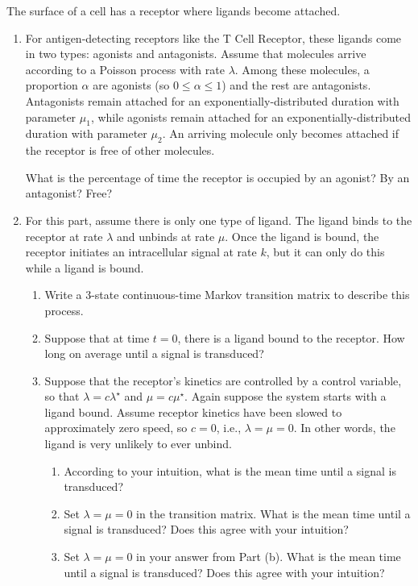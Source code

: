 \documentclass[12pt,letterpaper]{article}
\begin{document}
The surface of a cell has a receptor where ligands become attached. 

\begin{enumerate}






\item For antigen-detecting receptors like the T Cell Receptor, these ligands come in two types: agonists and antagonists. Assume that molecules arrive according to a Poisson process with rate $\lambda$. Among these molecules, a proportion $\alpha$ are agonists (so $0\leq \alpha \leq 1$) and the rest are antagonists. Antagonists remain attached for an exponentially-distributed duration with parameter $\mu_1$, while agonists remain attached for an exponentially-distributed duration with parameter $\mu_2$. An arriving molecule only becomes attached if the receptor is free of other molecules. 

What is the percentage of time the receptor is occupied by an agonist? By an antagonist? Free?

\item For this part, assume there is only one type of ligand. The ligand binds to the receptor at rate $\lambda$ and unbinds at rate $\mu$. Once the ligand is bound, the receptor initiates an intracellular signal at rate $k$, but it can only do this while a ligand is bound. 

\begin{enumerate}
\item Write a 3-state continuous-time Markov transition matrix to describe this process. 

\item Suppose that at time $t=0$, there is a ligand bound to the receptor. How long on average until a signal is transduced?

\item Suppose that the receptor's kinetics are controlled by a control variable, so that $\lambda = c \lambda^\star$ and $\mu = c\mu^\star$. Again suppose the system starts with a ligand bound. Assume receptor kinetics have been slowed to approximately zero speed, so $c=0$, i.e., $\lambda=\mu=0$. In other words, the ligand is very unlikely to ever unbind.

\begin{enumerate}
\item According to your intuition, what is the mean time until a signal is transduced?
\item Set $\lambda=\mu=0$ in the transition matrix. What is the mean time until a signal is transduced? Does this agree with your intuition?
\item Set $\lambda=\mu=0$ in your answer from Part (b). What is the mean time until a signal is transduced? Does this agree with your intuition?
\end{enumerate}

\end{enumerate}


\end{enumerate}
\end{document}
